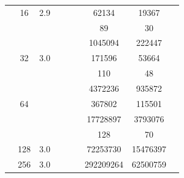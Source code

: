 \begin{table}[htbp]
\begin{tabular}{l S[table-format=3.0] S[table-format=4.1] l S[table-format=6.0] S[table-format=6.0] S[table-format=6.0] S[table-format=5.0] S[table-format=2.0]}
     & 16 & 2.9 &  & {\text{---}} & {\text{---}} & 62134 & 19367 & {\text{---}} \\
     &  &  &  & {\text{---}} & {\text{---}} & 89 & 30 & {\text{---}} \\
     &  &  &  & {\text{---}} & {\text{---}} & 1045094 & 222447 & {\text{---}} \\
     & 32 & 3.0 &  & {\text{---}} & {\text{---}} & 171596 & 53664 & {\text{---}} \\
     &  &  &  & {\text{---}} & {\text{---}} & 110 & 48 & {\text{---}} \\
     &  &  &  & {\text{---}} & {\text{---}} & 4372236 & 935872 & {\text{---}} \\
     & 64 & {\text{---}} &  & {\text{---}} & {\text{---}} & 367802 & 115501 & {\text{---}} \\
     &  &  &  & {\text{---}} & {\text{---}} & 17728897 & 3793076 & {\text{---}} \\
     &  &  &  & {\text{---}} & {\text{---}} & 128 & 70 & {\text{---}} \\
     & 128 & 3.0 &  & {\text{---}} & {\text{---}} & 72253730 & 15476397 & {\text{---}} \\
     & 256 & 3.0 &  & {\text{---}} & {\text{---}} & 292209264 & 62500759 & {\text{---}} \\
    \bottomrule
  \end{tabular}
\end{table}
